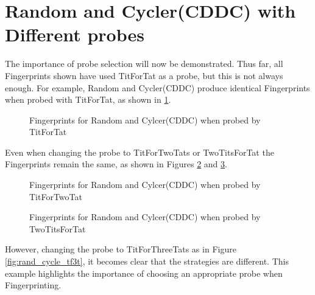 \section{Random and Cycler(CDDC) with Different probes}

The importance of probe selection will now be demonstrated.
Thus far, all Fingerprints shown have used TitForTat as a probe, but this is not always enough.
For example, Random and Cycler(CDDC) produce identical Fingerprints when probed with TitForTat, as shown in \ref{fig:rand_cycle_tft}.

\begin{figure}[htbp!]
    \centering
    \caption{Fingerprints for Random and Cylcer(CDDC) when probed by TitForTat}
    \label{fig:rand_cycle_tft}
\end{figure}

Even when changing the probe to TitForTwoTats or TwoTitsForTat the Fingerprints remain the same, as shown in Figures \ref{fig:rand_cycle_tf2t} and \ref{fig:rand_cycle_2tft}.

\begin{figure}[htbp!]
    \centering
    \caption{Fingerprints for Random and Cylcer(CDDC) when probed by TitForTwoTat}
    \label{fig:rand_cycle_tf2t}
\end{figure}

\begin{figure}[htbp!]
    \centering
    \caption{Fingerprints for Random and Cylcer(CDDC) when probed by TwoTitsForTat}
    \label{fig:rand_cycle_2tft}
\end{figure}

However, changing the probe to TitForThreeTats as in Figure \ref{fig:rand_cycle_tf3t}, it becomes clear that the strategies are different.
This example highlights the importance of choosing an appropriate probe when Fingerprinting.

